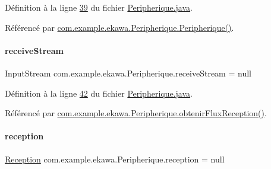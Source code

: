 Définition à la ligne \hyperlink{_peripherique_8java_source_l00039}{39} du fichier \hyperlink{_peripherique_8java_source}{Peripherique.\+java}.



Référencé par \hyperlink{_peripherique_8java_source_l00052}{com.\+example.\+ekawa.\+Peripherique.\+Peripherique()}.

\mbox{\label{classcom_1_1example_1_1ekawa_1_1_peripherique_af46a939491178c90c1ecd75dd781f4b6}} 
\paragraph{\texorpdfstring{receive\+Stream}{receiveStream}}
{\footnotesize\ttfamily Input\+Stream com.\+example.\+ekawa.\+Peripherique.\+receive\+Stream = null\hspace{0.3cm}{\ttfamily [private]}}



Définition à la ligne \hyperlink{_peripherique_8java_source_l00042}{42} du fichier \hyperlink{_peripherique_8java_source}{Peripherique.\+java}.



Référencé par \hyperlink{_peripherique_8java_source_l00252}{com.\+example.\+ekawa.\+Peripherique.\+obtenir\+Flux\+Reception()}.

\mbox{\label{classcom_1_1example_1_1ekawa_1_1_peripherique_a0192ad260e727ed46efa968a79364338}} 
\paragraph{\texorpdfstring{reception}{reception}}
{\footnotesize\ttfamily \hyperlink{classcom_1_1example_1_1ekawa_1_1_reception}{Reception} com.\+example.\+ekawa.\+Peripherique.\+reception = null\hspace{0.3cm}{\ttfamily [private]}}



